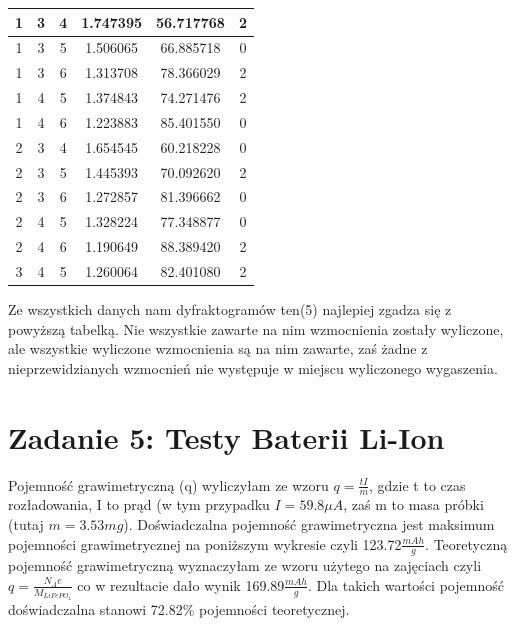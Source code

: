 \documentclass[a4paper,10pt]{article}
\begin{document}
\begin{tabular}{|cccccc|}
  1 &  3 &  4 &     1.747395 &            56.717768 &            2 \\\hline
  1 &  3 &  5 &     1.506065 &            66.885718 &            0 \\\hline
  1 &  3 &  6 &     1.313708 &            78.366029 &            2 \\\hline
  1 &  4 &  5 &     1.374843 &            74.271476 &            2 \\\hline
  1 &  4 &  6 &     1.223883 &            85.401550 &            0 \\\hline
  2 &  3 &  4 &     1.654545 &            60.218228 &            0 \\\hline
  2 &  3 &  5 &     1.445393 &            70.092620 &            2 \\\hline
  2 &  3 &  6 &     1.272857 &            81.396662 &            0 \\\hline
  2 &  4 &  5 &     1.328224 &            77.348877 &            0 \\\hline
  2 &  4 &  6 &     1.190649 &            88.389420 &            2 \\\hline
  3 &  4 &  5 &     1.260064 &            82.401080 &            2 \\\hline
\end{tabular}

Ze wszystkich danych nam dyfraktogramów ten(5) najlepiej zgadza się z powyższą tabelką. Nie wszystkie zawarte na nim wzmocnienia zostały wyliczone, ale wszystkie wyliczone wzmocnienia są na nim zawarte, zaś żadne z nieprzewidzianych wzmocnień nie występuje w miejscu wyliczonego wygaszenia. 

\section{Zadanie 5: Testy Baterii Li-Ion}
Pojemność grawimetryczną (q) wyliczyłam ze wzoru $q=\frac{tI} {m} $, gdzie t to czas rozładowania, I to prąd (w tym przypadku $I=59.8\mu A$, zaś m to masa próbki (tutaj $m=3.53mg$). Doświadczalna pojemność grawimetryczna jest maksimum pojemności grawimetrycznej na poniższym wykresie czyli 123.72$\frac{mAh}{g}$.
Teoretyczną pojemność grawimetryczną wyznaczyłam ze wzoru użytego na zajęciach czyli $q = \frac{N_A e}{M_{LiFePO_4}}$ co w rezultacie dało wynik 169.89$\frac{mAh}{g}$. Dla takich wartości pojemność doświadczalna stanowi 72.82\% pojemności teoretycznej.
\end{document}
